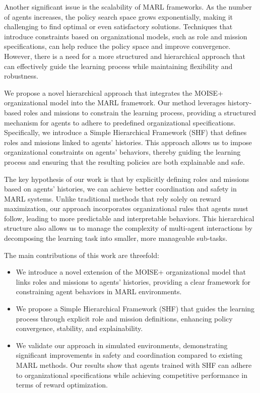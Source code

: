 \documentclass[sigconf,anonymous]{aamas}
\begin{document}
Another significant issue is the scalability of MARL frameworks. As the number of agents increases, the policy search space grows exponentially, making it challenging to find optimal or even satisfactory solutions. Techniques that introduce constraints based on organizational models, such as role and mission specifications, can help reduce the policy space and improve convergence. However, there is a need for a more structured and hierarchical approach that can effectively guide the learning process while maintaining flexibility and robustness.


We propose a novel hierarchical approach that integrates the MOISE+ organizational model into the MARL framework. Our method leverages history-based roles and missions to constrain the learning process, providing a structured mechanism for agents to adhere to predefined organizational specifications. Specifically, we introduce a Simple Hierarchical Framework (SHF) that defines roles and missions linked to agents' histories. This approach allows us to impose organizational constraints on agents' behaviors, thereby guiding the learning process and ensuring that the resulting policies are both explainable and safe.

The key hypothesis of our work is that by explicitly defining roles and missions based on agents' histories, we can achieve better coordination and safety in MARL systems. Unlike traditional methods that rely solely on reward maximization, our approach incorporates organizational rules that agents must follow, leading to more predictable and interpretable behaviors. This hierarchical structure also allows us to manage the complexity of multi-agent interactions by decomposing the learning task into smaller, more manageable sub-tasks.

The main contributions of this work are threefold:

\begin{itemize}
    \item We introduce a novel extension of the MOISE+ organizational model that links roles and missions to agents' histories, providing a clear framework for constraining agent behaviors in MARL environments.
    \item We propose a Simple Hierarchical Framework (SHF) that guides the learning process through explicit role and mission definitions, enhancing policy convergence, stability, and explainability.
    \item We validate our approach in simulated environments, demonstrating significant improvements in safety and coordination compared to existing MARL methods. Our results show that agents trained with SHF can adhere to organizational specifications while achieving competitive performance in terms of reward optimization.
\end{itemize}
\end{document}

